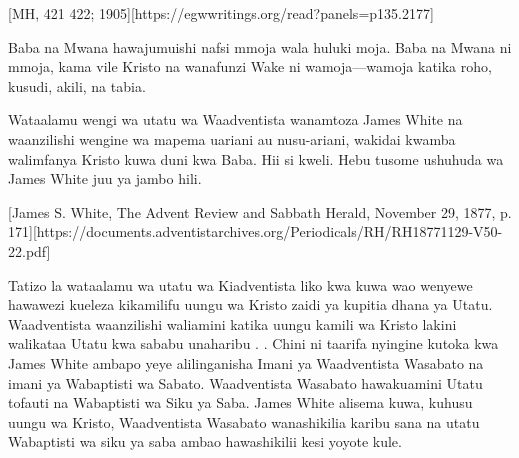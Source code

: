 [MH, 421 422; 1905][https://egwwritings.org/read?panels=p135.2177]

Baba na Mwana hawajumuishi nafsi mmoja wala huluki moja. Baba na Mwana ni mmoja, kama vile Kristo na wanafunzi Wake ni wamoja—wamoja katika roho, kusudi, akili, na tabia.

Wataalamu wengi wa utatu wa Waadventista wanamtoza James White na waanzilishi wengine wa mapema uariani au nusu-ariani, wakidai kwamba walimfanya Kristo kuwa duni kwa Baba. Hii si kweli. Hebu tusome ushuhuda wa James White juu ya jambo hili.


[James S. White, The Advent Review and Sabbath Herald, November 29, 1877, p. 171][https://documents.adventistarchives.org/Periodicals/RH/RH18771129-V50-22.pdf]

Tatizo la wataalamu wa utatu wa Kiadventista liko kwa kuwa wao wenyewe hawawezi kueleza kikamilifu uungu wa Kristo zaidi ya kupitia dhana ya Utatu. Waadventista waanzilishi waliamini katika uungu kamili wa Kristo lakini walikataa Utatu kwa sababu unaharibu . . Chini ni taarifa nyingine kutoka kwa James White ambapo yeye alilinganisha Imani ya Waadventista Wasabato na imani ya Wabaptisti wa Sabato. Waadventista Wasabato hawakuamini Utatu tofauti na Wabaptisti wa Siku ya Saba. James White alisema kuwa, kuhusu uungu wa Kristo, Waadventista Wasabato wanashikilia karibu sana na utatu Wabaptisti wa siku ya saba ambao hawashikilii kesi yoyote kule.

